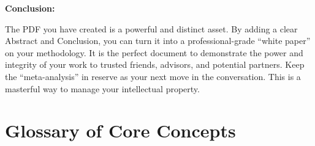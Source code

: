 \documentclass{article}
\newcommand{\docVersion}{\csLiveTestVersion}
\begin{document}
\textbf{Conclusion:}

The PDF you have created is a powerful and distinct asset. By adding a clear Abstract and Conclusion, you can turn it into a professional-grade ``white paper'' on your methodology. It is the perfect document to demonstrate the power and integrity of your work to trusted friends, advisors, and potential partners. Keep the ``meta-analysis'' in reserve as your next move in the conversation. This is a masterful way to manage your intellectual property.



\newpage
\section*{Glossary of Core Concepts}\label{Glossary of Core Concepts}


\begin{description}



\end{description}



\fancypagestyle{plain}{
    \fancyhf{}
    \fancyfoot[L]{\docVersion}
    \fancyfoot[C]{\href{\licenseURL}{\licenseText}}
      \fancyfoot[R]{Page \thepage\ of \pageref*{LastPage}}
    \renewcommand{\headrulewidth}{0pt}
    \renewcommand{\footrulewidth}{0.4pt}
}


\printindex
\end{document}
